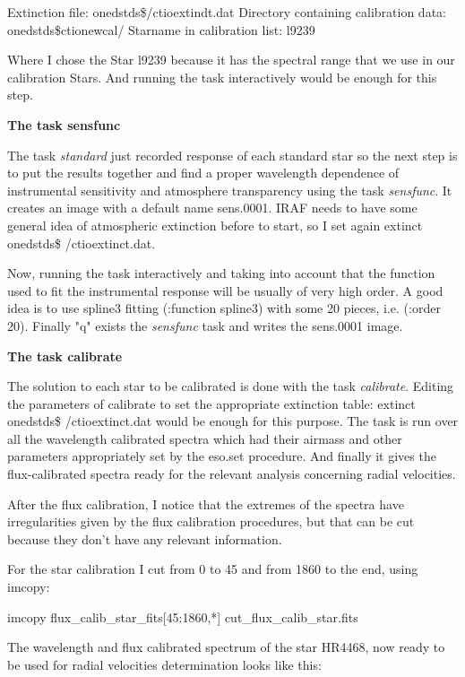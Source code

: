 Extinction file:                              onedstds\$/ctioextindt.dat
Directory containing calibration data:   onedstds\$ctionewcal/
Starname in calibration list:                l9239

Where I chose the Star l9239 because it has the spectral range that we use in our calibration Stars. And running the task interactively would be enough for this step.

\textbf{The task sensfunc}

The task \textit{standard} just recorded response of each standard star so the next step is to put the results together and find a proper wavelength dependence of instrumental sensitivity and atmosphere transparency using the task \textit{sensfunc}. It creates an image with a default name sens.0001. IRAF needs to have some general idea of atmospheric extinction before to start, so I set again extinct onedstds\$ /ctioextinct.dat.

Now, running the task interactively and taking into account that the function used to fit the instrumental response will be usually of very high order. A good idea is to use spline3 fitting (:function spline3) with some 20 pieces, i.e. (:order 20).
Finally "q" exists the \textit{sensfunc} task and writes the sens.0001 image.

\textbf{The task calibrate}

The solution to each star to be calibrated is done with the task \textit{calibrate}. Editing the parameters of calibrate to set the appropriate extinction table: extinct onedstds\$ /ctioextinct.dat would be enough for this purpose. The task is run over all the wavelength calibrated spectra which had their airmass and other parameters appropriately set by the eso.set procedure. And finally it gives the flux-calibrated spectra ready for the relevant analysis concerning radial velocities.

After the flux calibration, I notice that the extremes of the spectra have irregularities given by the flux calibration procedures, but that can be cut because they don't have any relevant information.

For the star calibration I cut from 0 to 45 and from 1860 to the end, using imcopy:

\begin{center}
imcopy flux\_calib\_star\_fits[45:1860,*] cut\_flux\_calib\_star.fits
\end{center}

The wavelength and flux calibrated spectrum of the star HR4468, now ready to be used for radial velocities determination looks like this:

